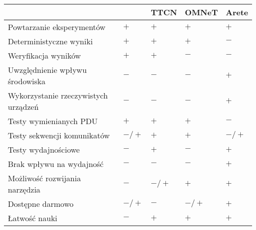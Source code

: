 \documentclass[00-praca-magisterska.tex]{subfiles}
\begin{document}
\begin{small}
\begin{center}
   \begin{tabular}{ l || C{1.1cm} | C{1.1cm} | C{1.1cm} | C{1.1cm}   }
      \hline
      & \small{\parbox[top][2.4em][c]{1.1cm}{}} & \small{TTCN} & \small{OMNeT} & \small{Arete} \\
      \hline
      Powtarzanie eksperymentów & $+$ & $+$ & $+$ & $+$ \\
      \hline
      Deterministyczne wyniki & $+$ & $+$ & $+$ & $-$ \\
      \hline
      Weryfikacja wyników & $+$ & $+$ & $-$ & $-$ \\
      \hline
      Uwzględnienie wpływu środowiska & $-$ & $-$ & $-$ & $+$ \\
      \hline
      Wykorzystanie rzeczywistych urządzeń & $-$ & $-$ & $-$ & $+$ \\
      \hline
      Testy wymienianych PDU & $+$ & $+$ & $+$ & $-$ \\
      \hline
      Testy sekwencji komunikatów & $-/+$ & $+$ & $+$ & $-/+$ \\
      \hline
      Testy wydajnościowe & $-$ & $+$ & $-$ & $+$ \\
      \hline
      Brak wpływu na wydajność & $-$ & $-$ & $-$ & $+$ \\
      \hline
      Możliwość rozwijania narzędzia & $-$ & $-/+$ & $+$ & $+$ \\
      \hline
      Dostępne darmowo & $-/+$ & $-$ & $-/+$ & $+$ \\
      \hline
      Łatwość nauki & $-$ &  $+$ & $+$ & $+$ \\
      \hline

  \end{tabular}
\end{center}
\end{small}
\end{document}
